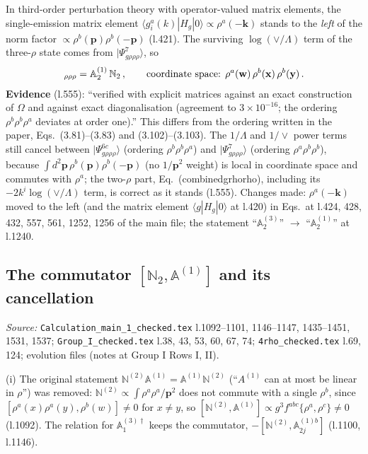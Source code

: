 \documentclass[10pt]{article}
\def\mf#1{\mathbb{#1}}
\begin{document}
\noindent In third-order perturbation theory with operator-valued matrix elements, the single-emission matrix element $\langle g^{a}_{i}(k)|H_{g}|0\rangle\propto\rho^{a}(-\mathbf{k})$ stands to the \emph{left} of the norm factor $\propto\rho^{b}(\mathbf{p})\rho^{b}(-\mathbf{p})$ (l.421). The surviving $\log(\vee/\Lambda)$ term of the three-$\rho$ state comes from $|\Psi^{7}_{g\rho\rho\rho}\rangle$, so
\begin{align}
[\mf{A}^{(3)}_{2}]_{\rho\rho\rho}=\mf{A}^{(1)}_{2}\,\mf{N}_{2}\,,\qquad\text{coordinate space: }\rho^{a}(\mathbf{w})\,\rho^{b}(\mathbf{x})\,\rho^{b}(\mathbf{y})\,.\notag
\end{align}
\textbf{Evidence} (l.555): ``verified with explicit matrices against an exact construction of $\Omega$ and against exact diagonalisation (agreement to $3\times10^{-16}$; the ordering $\rho^{b}\rho^{b}\rho^{a}$ deviates at order one).'' This differs from the ordering written in the paper, Eqs.~(3.81)--(3.83) and (3.102)--(3.103). The $1/\Lambda$ and $1/\vee$ power terms still cancel between $|\Psi^{6c}_{g\rho\rho\rho}\rangle$ (ordering $\rho^{b}\rho^{b}\rho^{a}$) and $|\Psi^{7}_{g\rho\rho\rho}\rangle$ (ordering $\rho^{a}\rho^{b}\rho^{b}$), because $\int d^{2}\mathbf{p}\,\rho^{b}(\mathbf{p})\rho^{b}(-\mathbf{p})$ (no $1/\mathbf{p}^{2}$ weight) is local in coordinate space and commutes with $\rho^{a}$; the two-$\rho$ part, Eq.~(combinedgrhorho), including its $-2k^{i}\log(\vee/\Lambda)$ term, is correct as it stands (l.555). Changes made: $\rho^{a}(-\mathbf{k})$ moved to the left (and the matrix element $\langle g|H_{g}|0\rangle$ at l.420) in Eqs.\ at l.424, 428, 432, 557, 561, 1252, 1256 of the main file; the statement ``$\mf{A}^{(3)}_{2}$'' $\to$ ``$\mf{A}^{(1)}_{2}$'' at l.1240.

\subsection{The commutator $[\mf{N}_{2},\mf{A}^{(1)}]$ and its cancellation}\label{sec:calc-comm}
\noindent\emph{Source:} \texttt{Calculation\_main\_1\_checked.tex} l.1092--1101, 1146--1147, 1435--1451, 1531, 1537; \texttt{Group\_I\_checked.tex} l.38, 43, 53, 60, 67, 74; \texttt{4rho\_checked.tex} l.69, 124; evolution files (notes at Group I Rows I, II).

\noindent (i) The original statement $\mf{N}^{(2)}\mf{A}^{(1)}=\mf{A}^{(1)}\mf{N}^{(2)}$ (``$A^{(1)}$ can at most be linear in $\rho$'') was removed: $\mf{N}^{(2)}\propto\int\rho^{a}\rho^{a}/\mathbf{p}^{2}$ does not commute with a single $\rho^{b}$, since $[\rho^{a}(x)\rho^{a}(y),\rho^{b}(w)]\neq0$ for $x\neq y$, so $[\mf{N}^{(2)},\mf{A}^{(1)}]\propto g^{3}f^{abc}\{\rho^{a},\rho^{c}\}\neq0$ (l.1092). The relation for $\mf{A}^{(3)\dagger}_{1}$ keeps the commutator, $-[\mf{N}^{(2)},\mf{A}^{(1)b}_{2j}]$ (l.1100, l.1146).
\end{document}
